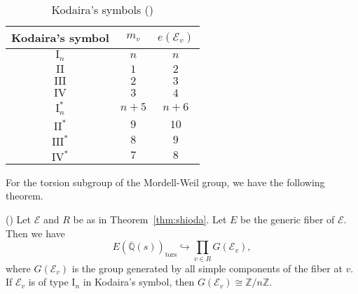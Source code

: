 \documentclass[main]{subfiles}
\begin{document}
\begin{table}[ht]
    \centering
    \caption{Kodaira's symbols (\cite[pp.136-137 付録2]{ref:shioda1993})}
    \begin{tabular}{|c|c|c|}
        \hline
        Kodaira's symbol & $m_v$ & $e(\mathcal{E}_v)$ \\
        \hline
        $\mathrm{I}_n$   & $n$   & $n$                \\
        $\mathrm{II}$    & $1$   & $2$                \\
        $\mathrm{III}$   & $2$   & $3$                \\
        $\mathrm{IV}$    & $3$   & $4$                \\
        $\mathrm{I}_n^*$ & $n+5$ & $n+6$              \\
        $\mathrm{II}^*$  & $9$   & $10$               \\
        $\mathrm{III}^*$ & $8$   & $9$                \\
        $\mathrm{IV}^*$  & $7$   & $8$                \\
        \hline
    \end{tabular}
\end{table}

For the torsion subgroup of the Mordell-Weil group, we have the following theorem.
\begin{thm}{(\cite[Lem.3.5]{ref:naskrecki2013})}
    \label{thm:torsion}
    Let $\mathcal{E}$ and $R$ be as in Theorem~\ref{thm:shioda}.
    Let $E$ be the generic fiber of $\mathcal{E}$.
    Then we have
    \begin{equation*}
        E(\overline{\mathbb{Q}}(s))_{\text{tors}} \hookrightarrow \prod_{v \in R} G(\mathcal{E}_{v}),
    \end{equation*}
    where $G(\mathcal{E}_{v})$ is the group generated by all simple components of the fiber at $v$.
    If $\mathcal{E}_{v}$ is of type $\mathrm{I}_n$ in Kodaira's symbol, then $G(\mathcal{E}_{v}) \cong \mathbb{Z} / n \mathbb{Z}$.
\end{thm}
\end{document}
